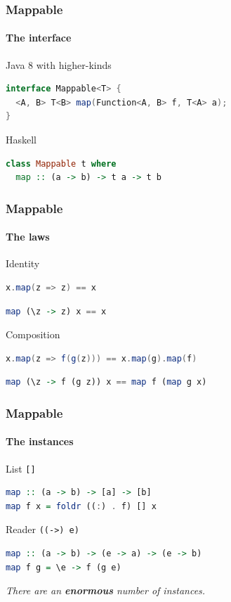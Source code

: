 \begin{frame}[fragile]
\frametitle{Mappable}
\framesubtitle{The interface}
\begin{block}{Java 8 with higher-kinds}
\begin{lstlisting}[style=language,language=java]
interface Mappable<T> {
  <A, B> T<B> map(Function<A, B> f, T<A> a);
}
\end{lstlisting}
\end{block}
\begin{block}{Haskell}
\begin{lstlisting}[style=language,language=haskell]
class Mappable t where
  map :: (a -> b) -> t a -> t b
\end{lstlisting}
\end{block}
\end{frame}

\begin{frame}[fragile]
\frametitle{Mappable}
\framesubtitle{The laws}
\begin{block}{Identity}
\begin{lstlisting}[style=language,language=java]
x.map(z => z) == x
\end{lstlisting}
\begin{lstlisting}[style=language,language=haskell]
map (\z -> z) x == x
\end{lstlisting}
\end{block}
\begin{block}{Composition}
\begin{lstlisting}[style=language,language=java]
x.map(z => f(g(z))) == x.map(g).map(f)
\end{lstlisting}
\begin{lstlisting}[style=language,language=haskell]
map (\z -> f (g z)) x == map f (map g x)
\end{lstlisting}
\end{block}
\end{frame}

\begin{frame}[fragile]
\frametitle{Mappable}
\framesubtitle{The instances}
\begin{block}{List \lstinline{[]}}
\begin{lstlisting}[style=language,language=haskell]
map :: (a -> b) -> [a] -> [b]
map f x = foldr ((:) . f) [] x
\end{lstlisting}
\end{block}
\begin{block}{Reader \lstinline{((->) e)}}
\begin{lstlisting}[style=language,language=haskell]
map :: (a -> b) -> (e -> a) -> (e -> b)
map f g = \e -> f (g e)
\end{lstlisting}
\end{block}
\emph{There are an \textbf{enormous} number of instances.}
\end{frame}

